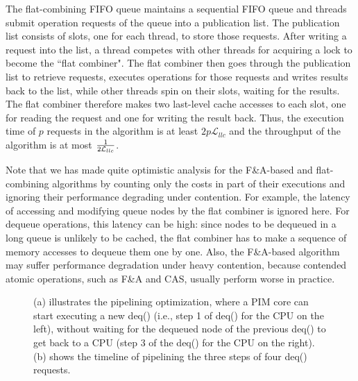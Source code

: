 \documentclass[11pt]{article}
\newcommand{\latllc} {\mathcal{L}_{llc}}
\begin{document}
The flat-combining FIFO queue maintains a sequential FIFO queue and threads submit operation requests 
of the queue into a publication list. 
The publication list consists of slots, one for each thread, to store those requests.
After writing a request into the list, a thread competes with other threads for acquiring a lock 
to become the ``flat combiner". 
The flat combiner then goes through the publication list to retrieve requests, executes operations for 
those requests and writes results back to the list, while other threads spin on their slots, 
waiting for the results. 
The flat combiner therefore makes two last-level cache accesses to each slot, 
one for reading the request and one for writing the result back. 
Thus, the execution time of $p$ requests in the algorithm is at least $2p\latllc$ and 
the throughput of the algorithm is at most ${1 \over 2\latllc}$.

Note that we has made quite optimistic analysis for the F\&A-based and flat-combining algorithms by counting  only the costs in part of their executions and ignoring their performance degrading under contention. 
For example, the latency of accessing and modifying queue nodes by the flat combiner is ignored here. 
For dequeue operations, this latency can be high: since nodes to be dequeued in a long queue is unlikely 
to be cached, the flat combiner has to make a sequence of memory accesses to dequeue them one by one.  
Also, the F\&A-based algorithm may suffer performance degradation under heavy contention, 
because contended atomic operations, such as F\&A and CAS, usually perform worse in practice.

\begin{figure}[ht!]
\centering
{}

\caption{(a) illustrates the pipelining optimization, where a PIM core can start executing a new 
deq() (i.e., step 1 of deq() for the CPU on the left), without waiting for the dequeued node of the previous deq() 
to get back to a CPU (step 3 of the deq() for the CPU on the right). 
(b) shows the timeline of pipelining the three steps of four deq() requests.}
\label{figure:queue_pipeline}
\end{figure}
\end{document}

